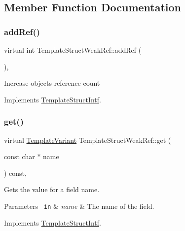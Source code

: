 \subsection{Member Function Documentation}
\mbox{\label{class_template_struct_weak_ref_a75d43b840dbfbd6b4ef6ca78bd13c015}} 
\subsubsection{\texorpdfstring{addRef()}{addRef()}}
{\footnotesize\ttfamily virtual int Template\+Struct\+Weak\+Ref\+::add\+Ref (\begin{DoxyParamCaption}{ }\end{DoxyParamCaption})\hspace{0.3cm}{\ttfamily [inline]}, {\ttfamily [virtual]}}

Increase object\textquotesingle{}s reference count 

Implements \mbox{\hyperlink{class_template_struct_intf_a05fe97ad47633beb326f69686faed581}{Template\+Struct\+Intf}}.

\mbox{\label{class_template_struct_weak_ref_aa858d11ac114c0c0254c607a8f1ce817}} 
\subsubsection{\texorpdfstring{get()}{get()}}
{\footnotesize\ttfamily virtual \mbox{\hyperlink{class_template_variant}{Template\+Variant}} Template\+Struct\+Weak\+Ref\+::get (\begin{DoxyParamCaption}\item[{const char $\ast$}]{name }\end{DoxyParamCaption}) const\hspace{0.3cm}{\ttfamily [inline]}, {\ttfamily [virtual]}}

Gets the value for a field name. 
\begin{DoxyParams}[1]{Parameters}
\mbox{\texttt{ in}}  & {\em name} & The name of the field. \\
\hline
\end{DoxyParams}


Implements \mbox{\hyperlink{class_template_struct_intf_a3d610cb81b4adbb531ebed3aa3d09b51}{Template\+Struct\+Intf}}.

